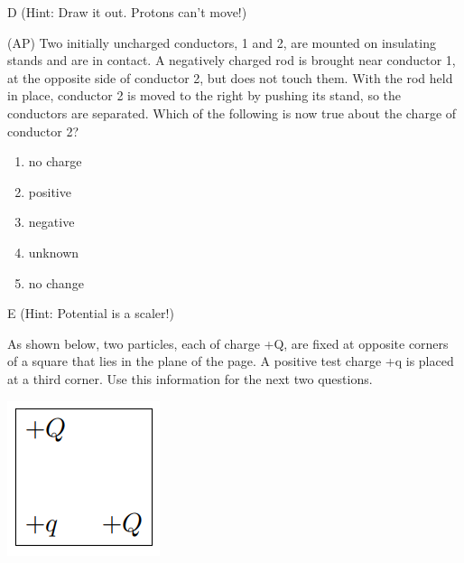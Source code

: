 \begin{solution}
D (Hint: Draw it out. Protons can't move!)
\end{solution}


\begin{question}
(AP) Two initially uncharged conductors, 1 and 2, are mounted on insulating stands and are in contact. A negatively charged rod is brought near conductor 1, at the opposite side of conductor 2, but does not touch them. With the rod held in place, conductor 2 is moved to the right by pushing its stand, so the conductors are separated. Which of the following is now true about the charge of conductor 2?
\begin{multicols}{5}
\begin{enumerate}[label=(\alph*)]
    \item no charge
    \item positive
    \item negative
    \item unknown
    \item no change
\end{enumerate}
\end{multicols}

\end{question}

\begin{solution}
E (Hint: Potential is a scaler!)
\end{solution}

\newpage
As shown below, two particles, each of charge +Q, are fixed at opposite corners of a square that lies in the plane of the page. A positive test charge +q is placed at a third corner. Use this information for the next two questions.

\begin{center}
\includegraphics{Figures/Figure25}
\end{center}

